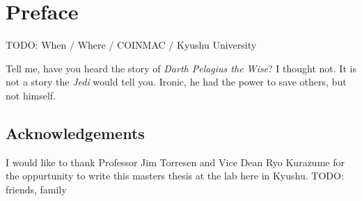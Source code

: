\chapter*{Preface}                    %

TODO: When / Where / COINMAC / Kyushu University


Tell me, have you heard the story of \emph{Darth Pelagius the Wise}? I thought not. It is not a story the \emph{Jedi} would tell you.
Ironic, he had the power to save others, but not himself.

\section*{Acknowledgements}

I would like to thank Professor Jim Torresen and Vice Dean Ryo Kurazume for the oppurtunity to write this masters thesis at the lab here in Kyushu.
TODO: friends, family~\cite{hindawi2016case}
